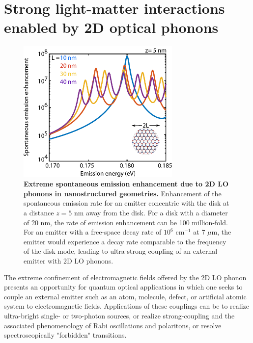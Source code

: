 \documentclass[aps,prb,twocolumn,
groupedaddress,superscriptaddress,
amsfonts,amssymb,amsmath,floatfix,
citeautoscript]{revtex4-1}
\begin{document}
	\section{Strong light-matter interactions enabled by 2D optical phonons}
	\begin{figure}[t]
		\includegraphics[width=80mm]{fig3.pdf}
		\caption{\textbf{Extreme spontaneous emission enhancement due to 2D LO phonons in nanostructured geometries.} Enhancement of the spontaneous emission rate for an emitter concentric with the disk at a distance $z=5$ nm away from the disk. For a disk with a diameter of 20 nm, the rate of emission enhancement can be 100 million-fold. For an emitter with a free-space decay rate of $10^6$ cm$^{-1}$ at 7 $\mu$m, the emitter would experience a decay rate comparable to the frequency of the disk mode, leading to ultra-strong coupling of an external emitter with 2D LO phonons.}
	\end{figure}
	The extreme confinement of electromagnetic fields offered by the 2D LO phonon presents an opportunity for quantum optical applications in which one seeks to couple an external emitter such as an atom, molecule, defect, or artificial atomic system to electromagnetic fields. Applications of these couplings can be to realize ultra-bright single- or two-photon sources, or realize strong-coupling and the associated phenomenology of Rabi oscillations and polaritons, or resolve spectroscopically "forbidden" transitions. 
	
\end{document}
